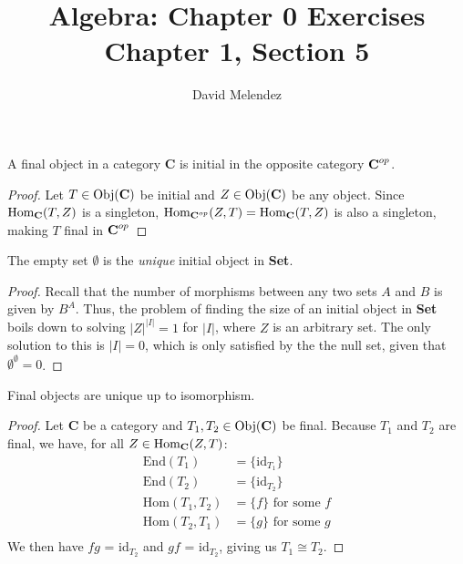 \documentclass[12pt]{article}
\newenvironment{problem}[2][Problem]{\begin{trivlist}
\item[\hskip \labelsep {\bfseries #1}\hskip \labelsep {\bfseries #2.}]}{\end{trivlist}}
\newcommand{\catname}[1]{\normalfont\textbf{#1}}
\newcommand{\Hom}{\text{Hom}}
\newcommand{\Homc}[2]{\Hom_{\catname{#1}}(#2)}
\newcommand{\Objc}[1]{\text{Obj}(\catname{#1})}
\newcommand{\End}{\text{End}}
\newcommand{\id}{\text{id}}
\begin{document}
\title{Algebra: Chapter 0 Exercises\\ \large Chapter 1, Section 5}
\author{David Melendez}
\maketitle

\begin{problem}{5.1}
  A final object in a category \catname{C} is initial in the opposite category $\catname{C}^{op}$.
\end{problem}
\begin{proof}
  Let $T \in \Objc{C}$ be initial and $Z \in \Objc{C}$ be any object. 
  Since $\Homc{C}{T, Z}$ is a singleton, 
  $\Hom_{\catname{C}^{op}}(Z, T) = \Homc{C}{T, Z}$ 
  is also a singleton, making $T$ final in $\catname{C}^{op}$
\end{proof}

\begin{problem}{5.2}
  The empty set $\emptyset$ is the \textit{unique} initial object in \catname{Set}.
\end{problem}
\begin{proof}
  Recall that the number of morphisms between any two sets $A$ and $B$ is given by $B^A$. 
  Thus, the problem of finding the size of an initial object in \catname{Set} boils down to solving $|Z|^{|I|}=1$ for $|I|$, where $Z$ is an arbitrary set.
  The only solution to this is $|I|=0$, which is only satisfied by the the null set, given that $\emptyset^\emptyset = 0$.
\end{proof}

\begin{problem}{5.3}
  Final objects are unique up to isomorphism.
\end{problem}
\begin{proof}
  Let \catname{C} be a category and $T_1, T_2\in \Objc{C}$ be final. Because $T_1$ and $T_2$ are final, we have, for all $Z\in\Homc{C}{Z, T}$:
  \begin{align*}
    \End(T_1) &= \{\id_{T_1}\}\\
    \End(T_2) &= \{\id_{T_2}\}\\
    \Hom(T_1, T_2) &= \{f\} \text{ for some } f\\
    \Hom(T_2, T_1) &= \{g\} \text{ for some } g\\
  \end{align*}
  We then have $fg$ = $\id_{T_2}$ and $gf$ = $\id_{T_2}$, giving us $T_1 \cong T_2$.
\end{proof}
\end{document}
